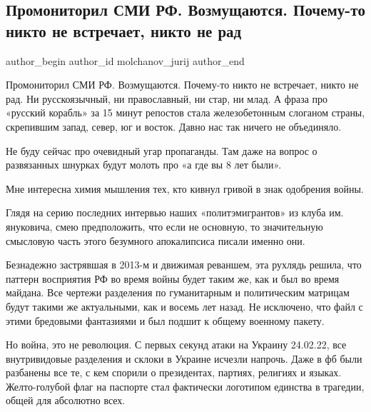  
 
 
 
 
 
\subsection{Промониторил СМИ РФ. Возмущаются. Почему-то никто не встречает, никто не рад}
\label{sec:03_03_2022.fb.molchanov_jurij.1.monitor_smi_rf}
 
\ifcmt
 author_begin
   author_id molchanov_jurij
 author_end
\fi

Промониторил СМИ РФ. Возмущаются. Почему-то никто не встречает, никто не рад.
Ни русскоязычный, ни православный, ни стар, ни млад. А фраза про «русский
корабль» за 15 минут репостов стала железобетонным слоганом страны, скрепившим
запад, север, юг и восток. Давно нас так ничего не объединяло.

Не буду сейчас про очевидный угар пропаганды. Там даже на вопрос о развязанных
шнурках будут молоть про «а где вы 8 лет были».

Мне интересна химия мышления тех, кто кивнул гривой в знак одобрения войны.

Глядя на серию последних интервью наших «политэмигрантов» из клуба им.
януковича, смею предположить, что если не основную, то значительную смысловую
часть этого безумного апокалипсиса писали именно они.

Безнадежно застрявшая в 2013-м и движимая реваншем, эта рухлядь решила, что
паттерн восприятия РФ во время войны будет таким же, как и был во время
майдана. Все чертежи разделения по гуманитарным и политическим матрицам будут
такими же актуальными, как и восемь лет назад. Не исключено, что файл с этими
бредовыми фантазиями и был подшит к общему военному пакету.

Но война, это не революция. С первых секунд атаки на Украину 24.02.22, все
внутривидовые разделения и склоки в Украине исчезли напрочь. Даже в фб были
разбанены все те, с кем спорили о президентах, партиях, религиях и языках.
Желто-голубой флаг на паспорте стал фактически логотипом единства в трагедии,
общей для абсолютно всех.

